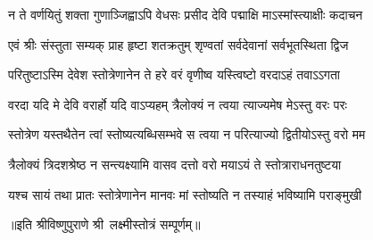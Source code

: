 \twolineshloka
{न ते वर्णयितुं शक्ता गुणाञ्जिह्वाऽपि वेधसः}
{प्रसीद देवि पद्माक्षि माऽस्मांस्त्याक्षीः कदाचन}

\twolineshloka
{एवं श्रीः संस्तुता सम्यक् प्राह हृष्टा शतक्रतुम्}
{शृण्वतां सर्वदेवानां सर्वभूतस्थिता द्विज}

\twolineshloka
{परितुष्टाऽस्मि देवेश स्तोत्रेणानेन ते हरे}
{वरं वृणीष्व यस्त्विष्टो वरदाऽहं तवाऽऽगता}

\twolineshloka
{वरदा यदि मे देवि वरार्हो यदि वाऽप्यहम्}
{त्रैलोक्यं न त्वया त्याज्यमेष मेऽस्तु वरः परः}

\twolineshloka
{स्तोत्रेण यस्तथैतेन त्वां स्तोष्यत्यब्धिसम्भवे}
{स त्वया न परित्याज्यो द्वितीयोऽस्तु वरो मम}

\twolineshloka
{त्रैलोक्यं त्रिदशश्रेष्ठ न सन्त्यक्ष्यामि वासव}
{दत्तो वरो मयाऽयं ते स्तोत्राराधनतुष्टया}

\twolineshloka
{यश्च सायं तथा प्रातः स्तोत्रेणानेन मानवः}
{मां स्तोष्यति न तस्याहं भविष्यामि पराङ्मुखी}

॥इति श्रीविष्णुपुराणे श्री~लक्ष्मीस्तोत्रं सम्पूर्णम्॥
